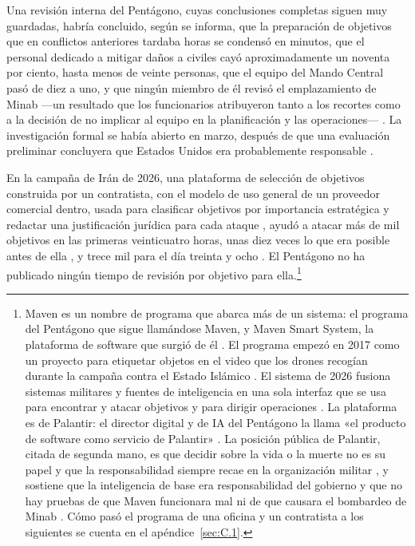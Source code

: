 Una revisión interna del Pentágono, cuyas conclusiones completas siguen muy guardadas, habría concluido, según se informa, que la preparación de objetivos que en conflictos anteriores tardaba horas se condensó en minutos, que el personal dedicado a mitigar daños a civiles cayó aproximadamente un noventa por ciento, hasta menos de veinte personas, que el equipo del Mando Central pasó de diez a uno, y que ningún miembro de él revisó el emplazamiento de Minab —un resultado que los funcionarios atribuyeron tanto a los recortes como a la decisión de no implicar al equipo en la planificación y las operaciones— \autocite{Bloomberg2026KillChain}. La investigación formal se había abierto en marzo, después de que una evaluación preliminar concluyera que Estados Unidos era probablemente responsable \autocite{NPR2026MinabProbe}.

En la campaña de Irán de 2026, una plataforma de selección de objetivos construida por un contratista, con el modelo de uso general de un proveedor comercial dentro, usada para clasificar objetivos por importancia estratégica y redactar una justificación jurídica para cada ataque \autocite{livingstone2026maven}, ayudó a atacar más de mil objetivos en las primeras veinticuatro horas, unas diez veces lo que era posible antes de ella \autocite{csis2026maven}, y trece mil para el día treinta y ocho \autocite{breakingdefense2026maven}. El Pentágono no ha publicado ningún tiempo de revisión por objetivo para ella.\footnote{Maven es un nombre de programa que abarca más de un sistema: el programa del Pentágono que sigue llamándose Maven, y Maven Smart System, la plataforma de software que surgió de él \autocite{csis2026maven}. El programa empezó en 2017 como un proyecto para etiquetar objetos en el video que los drones recogían durante la campaña contra el Estado Islámico \autocite{weisgerber2017maven,fang2019maven}. El sistema de 2026 fusiona sistemas militares y fuentes de inteligencia en una sola interfaz que se usa para encontrar y atacar objetivos y para dirigir operaciones \autocite{defensescoop2026transition}. La plataforma es de Palantir: el director digital y de IA del Pentágono la llama «el producto de software como servicio de Palantir» \autocite{defensescoop2026transition}. La posición pública de Palantir, citada de segunda mano, es que decidir sobre la vida o la muerte no es su papel y que la responsabilidad siempre recae en la organización militar \autocite{lee2026palantir}, y sostiene que la inteligencia de base era responsabilidad del gobierno y que no hay pruebas de que Maven funcionara mal ni de que causara el bombardeo de Minab \autocite{Bloomberg2026KillChain}. Cómo pasó el programa de una oficina y un contratista a los siguientes se cuenta en el apéndice~\ref{sec:C.1}.}

